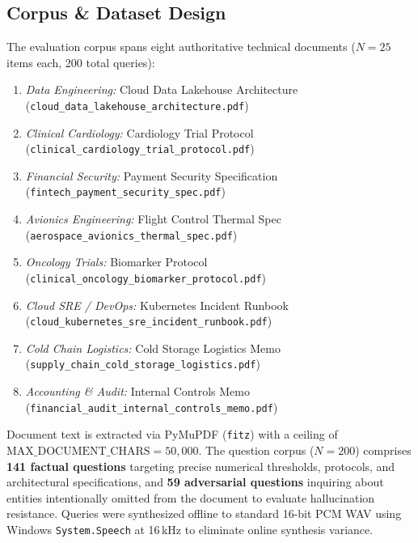 \documentclass[10pt,a4paper,twocolumn]{article}
\begin{document}
\subsection{Corpus \& Dataset Design}
The evaluation corpus spans eight authoritative technical documents ($N = 25$ items each, 200 total queries):
\begin{enumerate}
    \item \textit{Data Engineering:} Cloud Data Lakehouse Architecture (\texttt{cloud\_data\_lakehouse\_architecture.pdf})
    \item \textit{Clinical Cardiology:} Cardiology Trial Protocol (\texttt{clinical\_cardiology\_trial\_protocol.pdf})
    \item \textit{Financial Security:} Payment Security Specification (\texttt{fintech\_payment\_security\_spec.pdf})
    \item \textit{Avionics Engineering:} Flight Control Thermal Spec (\texttt{aerospace\_avionics\_thermal\_spec.pdf})
    \item \textit{Oncology Trials:} Biomarker Protocol (\texttt{clinical\_oncology\_biomarker\_protocol.pdf})
    \item \textit{Cloud SRE / DevOps:} Kubernetes Incident Runbook (\texttt{cloud\_kubernetes\_sre\_incident\_runbook.pdf})
    \item \textit{Cold Chain Logistics:} Cold Storage Logistics Memo (\texttt{supply_chain_cold_storage_logistics.pdf})
    \item \textit{Accounting \& Audit:} Internal Controls Memo (\texttt{financial_audit_internal_controls_memo.pdf})
\end{enumerate}

Document text is extracted via PyMuPDF (\texttt{fitz}) with a ceiling of $\text{MAX\_DOCUMENT\_CHARS} = 50,000$. The question corpus ($N = 200$) comprises \textbf{141 factual questions} targeting precise numerical thresholds, protocols, and architectural specifications, and \textbf{59 adversarial questions} inquiring about entities intentionally omitted from the document to evaluate hallucination resistance. Queries were synthesized offline to standard 16-bit PCM WAV using Windows \texttt{System.Speech} at 16\,kHz to eliminate online synthesis variance.
\end{document}
